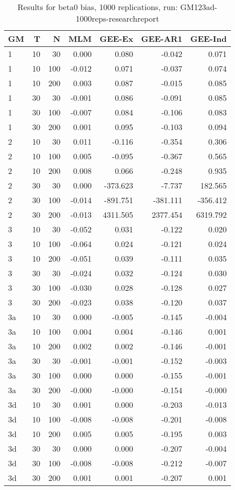 \begin{table}[ht]
\centering
\begin{tabular}{lrrrrrr}
  \hline
GM & T & N & MLM & GEE-Ex & GEE-AR1 & GEE-Ind \\ 
  \hline
1 & 10 & 30 & 0.000 & 0.080 & -0.042 & 0.071 \\ 
  1 & 10 & 100 & -0.012 & 0.071 & -0.037 & 0.074 \\ 
  1 & 10 & 200 & 0.003 & 0.087 & -0.015 & 0.085 \\ 
  1 & 30 & 30 & -0.001 & 0.086 & -0.091 & 0.085 \\ 
  1 & 30 & 100 & -0.007 & 0.084 & -0.106 & 0.083 \\ 
  1 & 30 & 200 & 0.001 & 0.095 & -0.103 & 0.094 \\ 
  2 & 10 & 30 & 0.011 & -0.116 & -0.354 & 0.306 \\ 
  2 & 10 & 100 & 0.005 & -0.095 & -0.367 & 0.565 \\ 
  2 & 10 & 200 & 0.008 & 0.066 & -0.248 & 0.935 \\ 
  2 & 30 & 30 & 0.000 & -373.623 & -7.737 & 182.565 \\ 
  2 & 30 & 100 & -0.014 & -891.751 & -381.111 & -356.412 \\ 
  2 & 30 & 200 & -0.013 & 4311.505 & 2377.454 & 6319.792 \\ 
  3 & 10 & 30 & -0.052 & 0.031 & -0.122 & 0.020 \\ 
  3 & 10 & 100 & -0.064 & 0.024 & -0.121 & 0.024 \\ 
  3 & 10 & 200 & -0.051 & 0.039 & -0.111 & 0.035 \\ 
  3 & 30 & 30 & -0.024 & 0.032 & -0.124 & 0.030 \\ 
  3 & 30 & 100 & -0.030 & 0.028 & -0.128 & 0.027 \\ 
  3 & 30 & 200 & -0.023 & 0.038 & -0.120 & 0.037 \\ 
  3a & 10 & 30 & 0.000 & -0.005 & -0.145 & -0.004 \\ 
  3a & 10 & 100 & 0.004 & 0.004 & -0.146 & 0.001 \\ 
  3a & 10 & 200 & 0.002 & 0.002 & -0.146 & -0.001 \\ 
  3a & 30 & 30 & -0.001 & -0.001 & -0.152 & -0.003 \\ 
  3a & 30 & 100 & 0.000 & 0.000 & -0.155 & -0.001 \\ 
  3a & 30 & 200 & -0.000 & -0.000 & -0.154 & -0.000 \\ 
  3d & 10 & 30 & 0.001 & 0.000 & -0.203 & -0.013 \\ 
  3d & 10 & 100 & -0.008 & -0.008 & -0.201 & -0.008 \\ 
  3d & 10 & 200 & 0.005 & 0.005 & -0.195 & 0.003 \\ 
  3d & 30 & 30 & 0.000 & 0.000 & -0.207 & -0.004 \\ 
  3d & 30 & 100 & -0.008 & -0.008 & -0.212 & -0.007 \\ 
  3d & 30 & 200 & 0.001 & 0.001 & -0.207 & 0.001 \\ 
   \hline
\end{tabular}
\caption{Results for beta0 bias, 1000 replications, run: GM123ad-1000reps-researchreport} 
\label{tab:beta0_bias}
\end{table}
